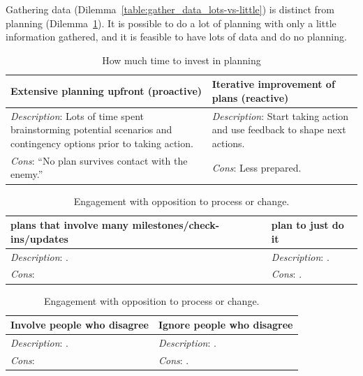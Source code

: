 Gathering data (Dilemma~\ref{table:gather_data_lots-vs-little}) is distinct from planning (Dilemma~\ref{table:planning}). It is possible to do a lot of planning with only a little information gathered, and it is feasible to have lots of data and do no planning. 

\begin{center}
\begin{table}[ht]
\begin{tabular}{ | m{\dilemmatablewidth}| m{\dilemmatablewidth} | } 
  \hline
  \textbf{Extensive planning upfront (proactive)} & 
  \textbf{Iterative improvement of plans (reactive)} \\ 
  \hline
  \textit{Description}: Lots of time spent brainstorming potential scenarios and contingency options prior to taking action. & 
  \textit{Description}: Start taking action and use feedback to shape next actions. \\ 
  \hline
  \textit{Cons}: ``No plan survives contact with the enemy.'' & 
  \textit{Cons}: Less prepared. \\  
  \hline
\end{tabular}
\caption{How much time to invest in planning
}
\label{table:planning}
\end{table}
\end{center}

\begin{center}
\begin{table}[ht]
\begin{tabular}{ | m{\dilemmatablewidth}| m{\dilemmatablewidth} | } 
  \hline
  \textbf{plans that involve many milestones/check-ins/updates} &
  \textbf{plan to just do it} \\
  \hline
  \textit{Description}: . & 
  \textit{Description}: . \\ 
  \hline
  \textit{Cons}:  & 
  \textit{Cons}: . \\  
  \hline
\end{tabular}
\caption{Engagement with opposition to process or change.
}
\label{table:just-do-it}
\end{table}
\end{center}


\begin{center}
\begin{table}[ht]
\begin{tabular}{ | m{\dilemmatablewidth}| m{\dilemmatablewidth} | } 
  \hline
  \textbf{Involve people who disagree} & 
  \textbf{Ignore people who disagree} \\ 
  \hline
  \textit{Description}: . & 
  \textit{Description}: . \\ 
  \hline
  \textit{Cons}:  & 
  \textit{Cons}: . \\  
  \hline
\end{tabular}
\caption{Engagement with opposition to process or change.
}
\label{table:opposition}
\end{table}
\end{center}

